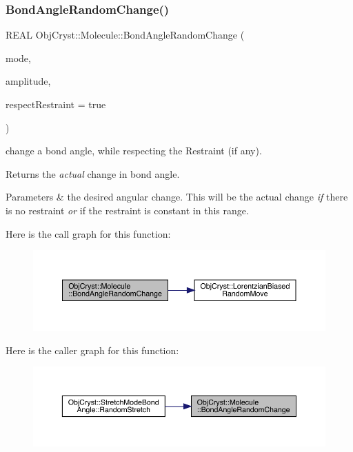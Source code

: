 \subsubsection{\texorpdfstring{BondAngleRandomChange()}{BondAngleRandomChange()}}
{\footnotesize\ttfamily R\+E\+AL Obj\+Cryst\+::\+Molecule\+::\+Bond\+Angle\+Random\+Change (\begin{DoxyParamCaption}\item[{const \mbox{\hyperlink{struct_obj_cryst_1_1_stretch_mode_bond_angle}{Stretch\+Mode\+Bond\+Angle}} \&}]{mode,  }\item[{const R\+E\+AL}]{amplitude,  }\item[{const bool}]{respect\+Restraint = {\ttfamily true} }\end{DoxyParamCaption})}

change a bond angle, while respecting the Restraint (if any).

\begin{DoxyReturn}{Returns}
the {\itshape actual} change in bond angle. 
\end{DoxyReturn}

\begin{DoxyParams}{Parameters}
{\em } & the desired angular change. This will be the actual change {\itshape if} there is no restraint {\itshape or} if the restraint is constant in this range. \\
\hline
\end{DoxyParams}
Here is the call graph for this function\+:
\nopagebreak
\begin{figure}[H]
\begin{center}
\leavevmode
\includegraphics[width=350pt]{class_obj_cryst_1_1_molecule_ad6e27c1557962b32355eeadf1bf155d3_cgraph}
\end{center}
\end{figure}
Here is the caller graph for this function\+:
\nopagebreak
\begin{figure}[H]
\begin{center}
\leavevmode
\includegraphics[width=350pt]{class_obj_cryst_1_1_molecule_ad6e27c1557962b32355eeadf1bf155d3_icgraph}
\end{center}
\end{figure}
\mbox{\label{class_obj_cryst_1_1_molecule_ad7bfddcdf21c1214c5a70c84fc54cdb0}} 
